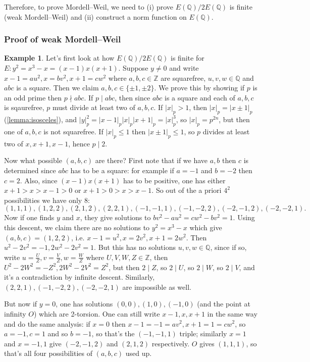 \documentclass{article}
\newcommand{\Z}{\mathbb{Z}}
\newcommand{\Q}{\mathbb{Q}}
\theoremstyle{definition}
\newtheorem{example}[defn]{Example}
\begin{document}
Therefore, to prove Mordell--Weil, we need to (i) prove $E(\Q)/2E(\Q)$ is finite (weak Mordell--Weil) and (ii) construct a norm function on $E(\Q)$.

\subsubsection{Proof of weak Mordell--Weil}

\begin{example}
\label{example:mordellweil}
Let's first look at how $E(\Q)/2E(\Q)$ is finite for $E:y^2=x^3-x=(x-1)x(x+1)$. Suppose $y\neq 0$ and write $x-1=au^2,x=bv^2,x+1=cw^2$ where $a,b,c\in\Z$ are squarefree, $u,v,w\in\Q$ and $abc$ is a square. Then we claim $a,b,c\in\{\pm 1,\pm 2\}$. We prove this by showing if $p$ is an odd prime then $p\nmid abc$. If $p\mid abc$, then since $abc$ is a square and each of $a,b,c$ is sqaurefree, $p$ must divide at least two of $a,b,c$. If $|x|_p>1$, then $|x|_p=|x\pm 1|_p$ (\ref{lemma:isosceles}), and $|y|_p^2=|x-1|_p|x|_p|x+1|_p=|x|_p^3$, so $|x|_p=p^{2n}$, but then one of $a,b,c$ is not squarefree. If $|x|_p\leq 1$ then $|x\pm 1|_p\leq 1$, so $p$ divides at least two of $x,x+1,x-1$, hence $p\mid 2$.

Now what possible $(a,b,c)$ are there? First note that if we have $a,b$ then $c$ is determined since $abc$ has to be a square: for example if $a=-1$ and $b=-2$ then $c=2$. Also, since $(x-1)x(x+1)$ has to be positive, one has either $x+1>x>x-1>0$ or $x+1>0>x>x-1$. So out of the a priori $4^2$ possibilities we have only 8:
\[
(1,1,1),(1,2,2),(2,1,2),(2,2,1),(-1,-1,1),(-1,-2,2),(-2,-1,2),(-2,-2,1).
\]
Now if one finds $y$ and $x$, they give solutions to $bv^2-au^2=cw^2-bv^2=1$. Using this descent, we claim there are no solutions to $y^2=x^3-x$ which give $(a,b,c)=(1,2,2)$, i.e. $x-1=u^2,x=2v^2,x+1=2w^2$. Then $u^2-2v^2=-1,2w^2-2v^2=1$. But this has no solutions $u,v,w\in\Q$, since if so, write $u=\frac{U}{Z},v=\frac{V}{Z},w=\frac{W}{Z}$ where $U,V,W,Z\in\Z$, then $U^2-2W^2=-Z^2,2W^2-2V^2=Z^2$, but then $2\mid Z$, so $2\mid U$, so $2\mid W$, so $2\mid V$, and it's a contradiction by infinite descent. Similarly, $(2,2,1),(-1,-2,2),(-2,-2,1)$ are impossible as well.

But now if $y=0$, one has solutions $(0,0),(1,0),(-1,0)$ (and the point at infinity $O$) which are 2-torsion. One can still write $x-1,x,x+1$ in the same way and do the same analysis: if $x=0$ then $x-1=-1=av^2,x+1=1=cw^2$, so $a=-1,c=1$ and so $b=-1$, so that's the $(-1,-1,1)$ triple; similarly $x=1$ and $x=-1,1$ give $(-2,-1,2)$ and $(2,1,2)$ respectively. $O$ gives $(1,1,1)$, so that's all four possibilities of $(a,b,c)$ used up.


\end{example}
\end{document}
